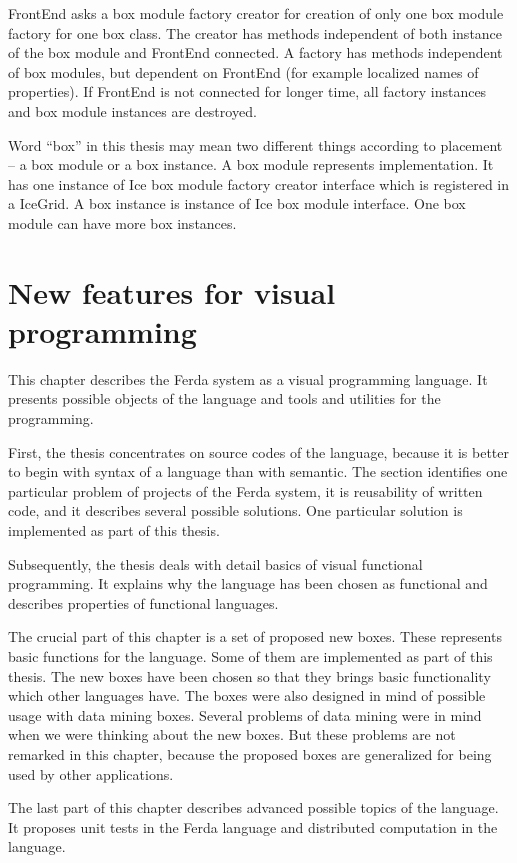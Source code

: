 \documentclass[a4paper,12pt]{book}
\begin{document}
FrontEnd asks a box module factory creator for creation of only one box module factory for one box class. The creator has methods independent of both instance of the box module and FrontEnd connected. A factory has methods independent of box modules, but dependent on FrontEnd (for example localized names of properties). If FrontEnd is not connected for longer time, all factory instances and box module instances are destroyed.

Word ``box'' in this thesis may mean two different things according to placement -- a box module or a box instance. A box module represents implementation. It has one instance of Ice box module factory creator interface which is registered in a IceGrid. A box instance is instance of Ice box module interface. One box module can have more box instances.

\chapter{New features for visual programming}
This chapter describes the Ferda system as a visual programming language. It presents possible objects of the language and tools and utilities for the programming.

First, the thesis concentrates on source codes of the language, because it is better to begin with syntax of a language than with semantic. The section identifies one particular problem of projects of the Ferda system, it is reusability of written code, and it describes several possible solutions. One particular solution is implemented as part of this thesis.

Subsequently, the thesis deals with detail basics of visual functional programming. It explains why the language has been chosen as functional and describes properties of functional languages.

The crucial part of this chapter is a set of proposed new boxes. These represents basic functions for the language. Some of them are implemented as part of this thesis. The new boxes have been chosen so that they brings basic functionality which other languages have. The boxes were also designed in mind of possible usage with data mining boxes. Several problems of data mining were in mind when we were thinking about the new boxes. But these problems are not remarked in this chapter, because the proposed boxes are generalized for being used by other applications.

The last part of this chapter describes advanced possible topics of the language. It proposes unit tests in the Ferda language and distributed computation in the language.
\end{document}
